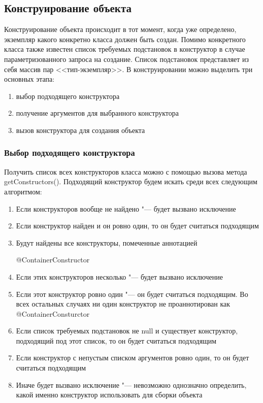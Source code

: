 \subsection{Конструирование объекта}

Конструирование объекта происходит в тот момент, когда уже определено, экземпляр какого конкретно класса должен быть создан. Помимо конкретного класса также известен список
требуемых подстановок в конструктор в случае параметризованного запроса на создание. Список подстановок представляет из себя массив пар <<тип-экземпляр>>.
В конструировании можно выделить три основных этапа:
\begin{enumerate}
	\item выбор подходящего конструктора
	\item получение аргументов для выбранного конструктора
	\item вызов конструктора для создания объекта
\end{enumerate}

\subsubsection{Выбор подходящего конструктора}

Получить список всех конструкторов класса можно с помощью вызова метода getConstructors(). Подходящий конструктор будем искать среди всех следующим алгоритмом:
\begin{enumerate}
	\item Если конструкторов вообще не найдено "--- будет вызвано исключение
	\item Если конструктор найден и он ровно один, то он будет считаться подходящим
	\item Будут найдены все конструкторы, помеченные аннотацией

@ContainerConstructor
	\item Если этих конструкторов несколько "--- будет вызвано исключение
	\item Если этот конструктор ровно один "--- он будет считаться подходящим. Во всех остальных случаях ни один конструктор не проаннотирован как @ContainerConsturctor
	\item Если список требуемых подстановок не null и существует конструктор, подходящий под этот список, то он будет считаться подходящим
	\item Если конструктор с непустым списком аргументов ровно один, то он будет считаться подходящим
	\item Иначе будет вызвано исключение "--- невозможно однозначно определить, какой именно конструктор использовать для сборки объекта
\end{enumerate}

